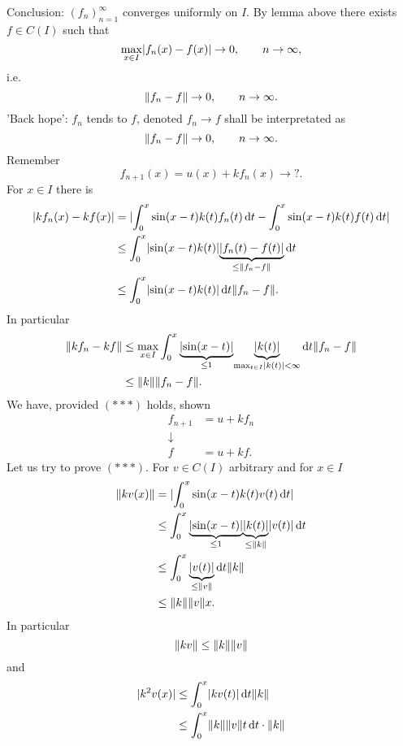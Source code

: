 \begin{enumerate}[1.]
	Conclusion: $(f_n)_{n=1}^{\infty}$ converges uniformly on $I$. By lemma above there exists $f \in C(I)$ such that
	\[
		\max_{x \in I}\lvert f_n(x)-f(x)\rvert \to 0, \qquad n \to \infty,
	\]
	i.e.
	\[
		\norm{f_n -f} \to 0, \qquad n \to \infty.
	\]
	'Back hope':
	$f_n$ tends to $f$, denoted $f_n \to f$ shall be interpretated as
	\[
		\norm{f_n -f} \to 0, \qquad n \to \infty.
	\]
	Remember
	\[
		f_{n+1}(x) = u(x) + k f_n(x) \to ?.
	\]
	For $x \in I$ there is
	\begin{align*}
		\abs{k f_n(x)- kf(x)} &= \abs{ \int_{0}^{x} \sin(x-t)k(t)f_n(t) \,\mathrm{d}t- \int_{0}^{x}\sin(x-t)k(t)f(t) \,\mathrm{d}t} \\
		&\leq \int_{0}^{x}\abs{\sin(x-t)k(t)}\underset{\leq \norm{f_n-f}}{\underbrace{\abs{f_n(t)-f(t)}}} \,\mathrm{d}t \\
		&\leq \int_{0}^{x}\abs{\sin(x-t)k(t)} \,\mathrm{d}t \norm{f_n-f}.
	\end{align*}
	In particular
	\begin{align*}
		\norm{k f_n- kf} &\leq \max_{x \in I}\int_{0}^{x} \underset{\leq 1}{\underbrace{\abs{\sin(x-t)}}} \underset{\max_{t \in I}\abs{k(t)}< \infty}{\underbrace{\abs{k(t)}}} \,\mathrm{d}t \norm{f_n -f} \\
		&\leq \norm{k} \norm{f_n-f}.
	\end{align*}
	We have, provided $(***)$ holds, shown
	\begin{align*}
		f_{n+1} &= u + k f_n \\
		\downarrow & \\
		f &= u + kf.
	\end{align*}
	Let us try to prove $(***)$. For $v \in C(I)$ arbitrary and for $x \in I$
	\begin{align*}
		\norm{kv(x)} &= \abs{\int_{0}^{x}\sin(x-t)k(t)v(t) \,\mathrm{d}t} \\
		&\leq \int_{0}^{x}\underset{\leq 1}{\underbrace{\abs{\sin(x-t)}}}\underset{\leq \norm{k}}{\underbrace{\abs{k(t)}}}\abs{v(t)} \,\mathrm{d}t \\
		&\leq \int_{0}^{x}\underset{\leq \norm{v}}{\underbrace{\abs{v(t)}}} \,\mathrm{d}t \norm{k} \\
		&\leq \norm{k} \norm{v}x.
	\end{align*}
	In particular
	\[
		\norm{kv} \leq \norm{k}\norm{v}
	\]
	and
	\begin{align*}
		\abs{k^2v(x)} &\leq \int_{0}^{x} \abs{kv(t)} \,\mathrm{d}t \norm{k} \\
		&\leq \int_{0}^{x}\norm{k}\norm{v}t \,\mathrm{d}t \cdot \norm{k} \\

\end{align*}
\end{enumerate}
